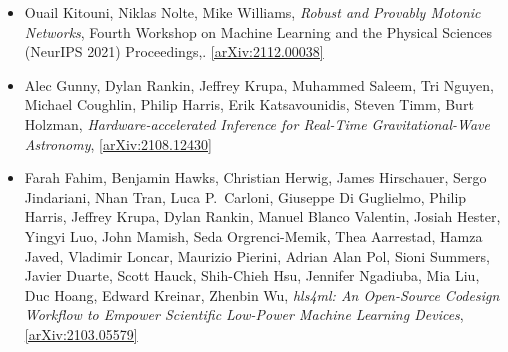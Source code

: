 \begin{itemize}
\item Ouail Kitouni, Niklas Nolte, Mike Williams, \textit{Robust and Provably Motonic Networks}, Fourth Workshop on Machine Learning and the Physical Sciences (NeurIPS 2021) Proceedings,. \href{https://arxiv.org/abs/2112.00038}{[arXiv:2112.00038]} 
\item Alec Gunny, Dylan Rankin, Jeffrey Krupa, Muhammed Saleem, Tri Nguyen, Michael Coughlin, Philip Harris, Erik Katsavounidis, Steven Timm, Burt Holzman, \textit{Hardware-accelerated Inference for Real-Time Gravitational-Wave Astronomy}, \href{https://arxiv.org/abs/2108.12430}{[arXiv:2108.12430]} 
\item Farah Fahim, Benjamin Hawks, Christian Herwig, James Hirschauer, Sergo Jindariani, Nhan Tran, Luca P.\  Carloni, Giuseppe Di Guglielmo, Philip Harris, Jeffrey Krupa, Dylan Rankin, Manuel Blanco Valentin, Josiah Hester, Yingyi Luo, John Mamish, Seda Orgrenci-Memik, Thea Aarrestad, Hamza Javed, Vladimir Loncar, Maurizio Pierini, Adrian Alan Pol, Sioni Summers, Javier Duarte, Scott Hauck, Shih-Chieh Hsu, Jennifer Ngadiuba, Mia Liu, Duc Hoang, Edward Kreinar, Zhenbin Wu, \textit{hls4ml: An Open-Source Codesign Workflow to Empower Scientific Low-Power Machine Learning Devices}, \href{https://arxiv.org/abs/2103.05579}{[arXiv:2103.05579]} 
\end{itemize}